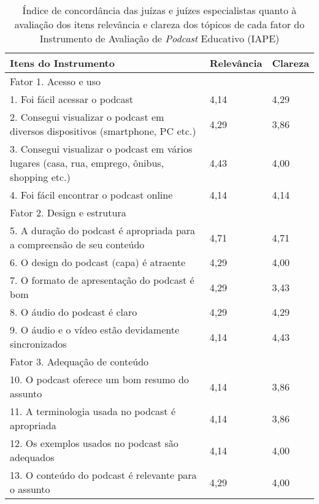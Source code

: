 \begin{table}[htpb]
\small
\centering
\begin{threeparttable}
\caption{Índice de concordância das juízas e juízes especialistas quanto à avaliação dos itens relevância e clareza dos tópicos de cada fator do Instrumento de Avaliação de \textit{Podcast} Educativo (IAPE)}
\label{tab-02}
\begin{tabular}{p{10cm} l l}
\toprule
Itens do Instrumento & Relevância & Clareza \\
\midrule
Fator 1. Acesso e uso & & \\
1. Foi fácil acessar o podcast & 4,14 & 4,29 \\
2. Consegui visualizar o podcast em diversos dispositivos (smartphone, PC etc.) & 4,29 & 3,86 \\
3. Consegui visualizar o podcast em vários lugares (casa, rua, emprego, ônibus, shopping etc.) & 4,43 & 4,00 \\
4. Foi fácil encontrar o podcast online & 4,14 & 4,14 \\
		
Fator 2. Design e estrutura & & \\
5. A duração do podcast é apropriada para a compreensão de seu conteúdo & 4,71 & 4,71 \\
6. O design do podcast (capa) é atraente & 4,29 & 4,00 \\
7. O formato de apresentação do podcast é bom & 4,29 & 3,43 \\
8. O áudio do podcast é claro & 4,29 & 4,29 \\
9. O áudio e o vídeo estão devidamente sincronizados & 4,14 & 4,43 \\
		
Fator 3. Adequação de conteúdo & & \\
10. O podcast oferece um bom resumo do assunto & 4,14 & 3,86 \\
11. A terminologia usada no podcast é apropriada & 4,14 & 3,86 \\
12. Os exemplos usados no podcast são adequados & 4,14 & 4,00 \\
13. O conteúdo do podcast é relevante para o assunto & 4,29 & 4,00 \\
		

\end{tabular}
\end{threeparttable}
\end{table}
